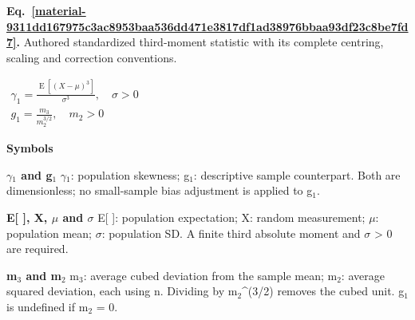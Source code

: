 \documentclass[11pt,a4paper]{article}
\begin{document}
\par\medskip
\noindent\begin{minipage}{\linewidth}
\label{material-9311dd167975c3ac8953baa536dd471e3817df1ad38976bbaa93df23c8be7fd7}
\noindent\textbf{Eq.~\ref*{material-9311dd167975c3ac8953baa536dd471e3817df1ad38976bbaa93df23c8be7fd7}.} Authored standardized third-moment statistic with its complete centring, scaling and correction conventions.\par\nopagebreak
\begin{center}\begin{adjustbox}{max width=\linewidth}$\displaystyle \begin{gathered}\gamma_1=\frac{\operatorname{E}[(X-\mu)^3]}{\sigma^3},\quad\sigma>0\\g_1=\frac{m_3}{m_2^{3/2}},\quad m_2>0\end{gathered}$\end{adjustbox}\end{center}

\par\noindent\textbf{Symbols}

\par\noindent\textbf{\ensuremath{\gamma}\ensuremath{{}_1} and g\ensuremath{{}_1}} \ensuremath{\gamma}\ensuremath{{}_1}: population skewness; g\ensuremath{{}_1}: descriptive sample counterpart. Both are dimensionless; no small-sample bias adjustment is applied to g\ensuremath{{}_1}.

\par\noindent\textbf{E[ ], X, \ensuremath{\mu} and \ensuremath{\sigma}} E[ ]: population expectation; X: random measurement; \ensuremath{\mu}: population mean; \ensuremath{\sigma}: population SD. A finite third absolute moment and \ensuremath{\sigma} > 0 are required.

\par\noindent\textbf{m\ensuremath{{}_3} and m\ensuremath{{}_2}} m\ensuremath{{}_3}: average cubed deviation from the sample mean; m\ensuremath{{}_2}: average squared deviation, each using n. Dividing by m\ensuremath{{}_2}\textasciicircum{}(3/2) removes the cubed unit. g\ensuremath{{}_1} is undefined if m\ensuremath{{}_2} = 0.

\end{minipage}\par
\medskip
\end{document}
